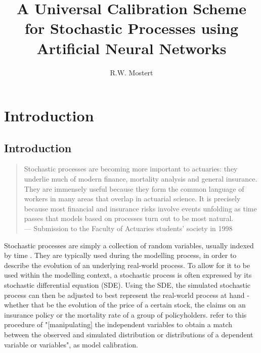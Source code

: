 \documentclass[11pt,oneside,openany,a4paper,english, report, goldenblock
]{usthesis}
\title{A Universal Calibration Scheme for Stochastic Processes using Artificial Neural Networks}
\author{R.W. Mostert}{Rayno Willem Mostert}
\begin{document}
	
	\TitlePage%
	
	\DeclarationPage
	
\begin{abstract}
	
\end{abstract}

\tableofcontents
	
\chapter{Introduction}
\section{Introduction}

\begin{quote}
	Stochastic processes are becoming more important to actuaries: they underlie much of modern finance, mortality analysis and general insurance. They are immensely useful because they form the common language of workers in many areas that overlap in actuarial science.  It is precisely because most financial and insurance risks involve events unfolding as time passes that models based on processes turn out to be most natural.
	\\ --- Submission to the Faculty of Actuaries students' society in 1998 \citep{cairns1998stochastic}
\end{quote}

Stochastic processes are simply a collection of random variables, usually indexed by time \citep{Barone-Adesi}. They are typically used during the modelling process, in order to describe the evolution of an underlying real-world process. To allow for it to be used within the modelling context, a stochastic process is often expressed by its stochastic differential equation (SDE). 
Using the SDE, the simulated stochastic process can then be adjusted to best represent the real-world process at hand - whether that be the evolution of the price of a certain stock, the claims on an insurance policy or the mortality rate of a group of policyholders. 
\citet{Oreskes} refer to this procedure of "[manipulating] the independent variables to obtain a match between the observed and simulated distribution or distributions of a dependent variable or variables", as model calibration.
\end{document}
